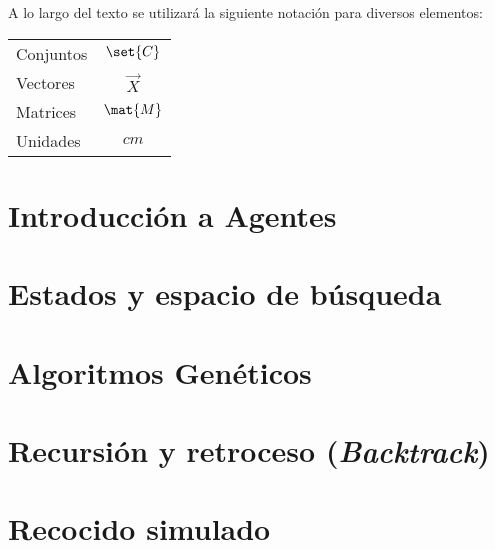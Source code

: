 \documentclass[12pt,openany]{book}
\begin{document}
A lo largo del texto se utilizará la siguiente notación para diversos elementos:
\begin{longtable}{lc}
 Conjuntos   &   $\set{C}$ \\
 Vectores    &   $\vec{X}$ \\
 Matrices    &   $\mat{M}$ \\
 Unidades    &   $\unit{cm}$
\end{longtable}



\chapter{Introducción a Agentes}





\chapter{Estados y espacio de búsqueda}





\chapter{Algoritmos Genéticos}






\chapter[Retroceso]{Recursión y retroceso (\textit{Backtrack})}







\chapter{Recocido simulado}



\end{document}
